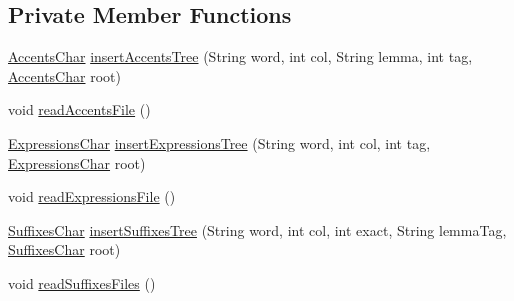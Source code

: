\subsection*{Private Member Functions}
\begin{DoxyCompactItemize}
\item 
\hyperlink{classbr_1_1usp_1_1cata_1_1util_1_1lemmatizer_1_1_accents_char}{Accents\+Char} \hyperlink{classbr_1_1usp_1_1cata_1_1component_1_1lemmatizer_1_1_lemmatizer_trees_a74231a5dc7bba4243a22e883d95e110f}{insert\+Accents\+Tree} (String word, int col, String lemma, int tag, \hyperlink{classbr_1_1usp_1_1cata_1_1util_1_1lemmatizer_1_1_accents_char}{Accents\+Char} root)
\item 
void \hyperlink{classbr_1_1usp_1_1cata_1_1component_1_1lemmatizer_1_1_lemmatizer_trees_a35774277b53429f3cfd07d7bfd3daf65}{read\+Accents\+File} ()
\item 
\hyperlink{classbr_1_1usp_1_1cata_1_1util_1_1lemmatizer_1_1_expressions_char}{Expressions\+Char} \hyperlink{classbr_1_1usp_1_1cata_1_1component_1_1lemmatizer_1_1_lemmatizer_trees_a6456da8739411ebc7fcaa1a37ed53199}{insert\+Expressions\+Tree} (String word, int col, int tag, \hyperlink{classbr_1_1usp_1_1cata_1_1util_1_1lemmatizer_1_1_expressions_char}{Expressions\+Char} root)
\item 
void \hyperlink{classbr_1_1usp_1_1cata_1_1component_1_1lemmatizer_1_1_lemmatizer_trees_a6c2d16f7d28382ea3440f0ddf3bdb5c9}{read\+Expressions\+File} ()
\item 
\hyperlink{classbr_1_1usp_1_1cata_1_1util_1_1lemmatizer_1_1_suffixes_char}{Suffixes\+Char} \hyperlink{classbr_1_1usp_1_1cata_1_1component_1_1lemmatizer_1_1_lemmatizer_trees_a441d84baf8fcf596911def5de2cd9b84}{insert\+Suffixes\+Tree} (String word, int col, int exact, String lemma\+Tag, \hyperlink{classbr_1_1usp_1_1cata_1_1util_1_1lemmatizer_1_1_suffixes_char}{Suffixes\+Char} root)
\item 
void \hyperlink{classbr_1_1usp_1_1cata_1_1component_1_1lemmatizer_1_1_lemmatizer_trees_a736c56ee1e984ca2f1eeafea2b6d8299}{read\+Suffixes\+Files} ()
\end{DoxyCompactItemize}
